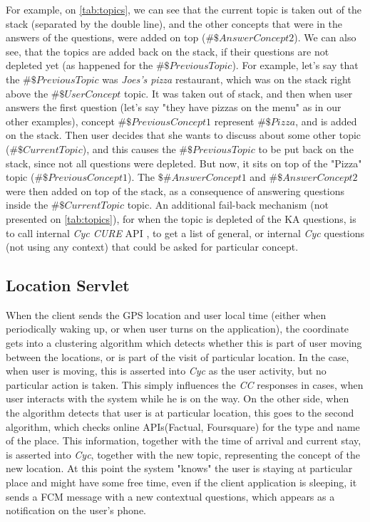 For example, on \autoref{tab:topics}, we can see that the current topic is
taken out of the stack (separated by the double line), and the other concepts 
that were in the answers of the questions, were added on top 
($\#\$AnswerConcept2$). We can also see, that the topics are added back on the
stack, if their questions are not depleted yet (as happened for the 
$\#\$PreviousTopic$). For example, let's say that the $\#\$PreviousTopic$ was
\emph{Joes's pizza} restaurant, which was on the stack right above the 
$\#\$UserConcept$ topic. It was taken out of stack, and then when user answers
the first question (let's say "they have pizzas on the menu" as in our other
examples), concept $\#\$PreviousConcept1$ represent $\#\$Pizza$, and is added
on the stack. Then user decides that she wants to discuss about some other 
topic ($\#\$CurrentTopic$), and this causes the $\#\$PreviousTopic$ to be put
back on the stack, since not all questions were depleted. But now, it sits
on top of the "Pizza" topic ($\#\$PreviousConcept1$). The $\$\#AnswerConcept1$ 
and $\#\$AnswerConcept2$ were then added on top of the stack, as a consequence 
of answering questions inside the $\#\$CurrentTopic$ topic. An additional 
fail-back mechanism (not presented on \autoref{tab:topics}), for when the
topic is depleted of the KA questions, is to call internal \emph{Cyc CURE} API
\autocite{Witbrock2010}, to get a list of general, or internal \emph{Cyc} 
questions (not using any context) that could be asked for particular concept.

\subsection{Location Servlet}
\label{section:locationServlet}
When the client sends the GPS location and user local time (either when 
periodically waking up, or when user turns on the application), the coordinate
gets into a clustering algorithm which detects whether this is part of user
moving between the locations, or is part of the visit of particular location.
In the case, when user is moving, this is asserted into \emph{Cyc} as the user
activity, but no particular action is taken. This simply influences the 
\emph{CC} responses in cases, when user interacts with the system while he is
on the way. On the other side, when the algorithm detects that user is at 
particular location, this goes to the second algorithm, which checks online 
APIs(Factual, Foursquare) for the type and name of the place. This information,
together with the time of arrival and current stay, is asserted into \emph{Cyc},
together with the new topic, representing the concept of the new location. 
At this point the system "knows" the user is staying at particular place and 
might have some free time, even if the client application is sleeping, it sends
a FCM message with a new contextual questions, which appears as a notification
on the user's phone.

